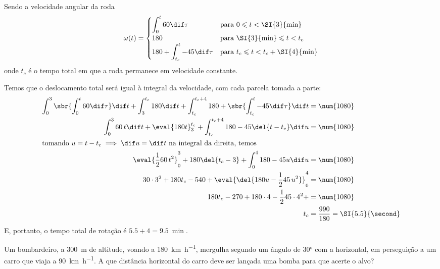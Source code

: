 \documentclass[]{IMTexam}
\begin{document}
\begin{questions}
\begin{solution}
		Sendo a velocidade angular da roda
		\[
			\omega(t)=\begin{cases}
				\displaystyle\int_0^{t}60\dif \tau          & \text{para }0\leqslant t < \SI{3}{\min}       \\
				180                                         & \text{para }\SI{3}{\min}\leqslant t < t_c     \\
				180+\displaystyle\int_{t_c}^{t}-45\dif \tau & \text{para }t_c\leqslant t < t_c+\SI{4}{\min}
			\end{cases} \]
		onde $ t_c $ é o tempo total em que a roda permanece em velocidade constante.

		Temos que o deslocamento total será igual à integral da velocidade, com cada parcela tomada a parte:
		\begin{align*}
			\int_{0}^{3}\sbr{\int_{0}^{t} 60 \dif \tau}\dif t+\int_{3}^{t_c} 180 \dif t+\int_{t_c}^{t_c+4}180+\sbr{\int_{t_c}^{t} -45 \dif \tau}\dif t & =\num{1080}                         \\
			\int_{0}^{3}60\,t\dif t+\eval{180t}_{3}^{t_c}+\int_{t_c}^{t_c+4}180-45\del{t-t_c}\dif u                                                    & =\num{1080}                         \\
			\intertext{tomando $ u=t-t_c\implies \dif u=\dif t $ na integral da direita, temos}
			\eval{\dfrac{1}{2}60\,t^{2}}_{0}^{3}+180\del{t_c-3}+\int_{0}^{4}180-45u\dif u                                                              & =\num{1080}                         \\
			30\cdot3^{2}+180t_c-540+\eval{\del{180u-\dfrac{1}{2}45\,u^{2}}}_{0}^{4}                                                                    & =\num{1080}                         \\
			180t_c-270+180\cdot4-\dfrac{1}{2}45\cdot4^{2}+                                                                                             & =\num{1080}                         \\
			t_c                                                                                                                                        & =\dfrac{990}{180}=\SI{5.5}{\second}
		\end{align*}
		E, portanto, o tempo total de rotação é $ \num{5.5}+4=\SI{9.5}{\min} $.
	\end{solution}



	\question
	Um bombardeiro, a \SI{300}{\meter} de altitude, voando a \SI{180}{\kilo\meter\per\hour}, mergulha segundo um ângulo de \ang{30} com a horizontal, em perseguição a um carro que viaja a \SI{90}{\kilo\meter\per\hour}. A que distância horizontal do carro deve ser lançada uma bomba para que acerte o alvo?


\end{questions}
\end{document}

